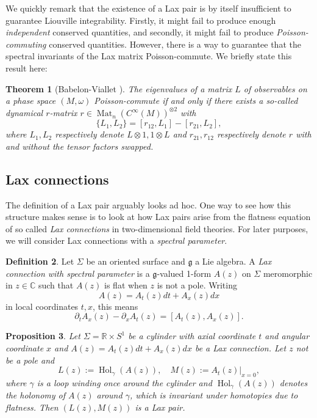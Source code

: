 \documentclass[11pt]{report}
\newtheorem{theorem}{Theorem}[section]
\newtheorem{prop}[theorem]{Proposition}
\theoremstyle{definition}
\newtheorem{definition}[theorem]{Definition}
\theoremstyle{remark}
\theoremstyle{remark}
\newcommand{\R}{\mathbb{R}}
\newcommand{\C}{\mathbb{C}}
\begin{document}
We quickly remark that the existence of a Lax pair is by itself insufficient to guarantee Liouville integrability. Firstly, it might fail to produce enough \emph{independent} conserved quantities, and secondly, it might fail to produce \emph{Poisson-commuting} conserved quantities. However, there is a way to guarantee that the spectral invariants of the Lax matrix Poisson-commute. We briefly state this result here:

\begin{theorem}[Babelon-Viallet \cite{book:arutyunov:elements}]
The eigenvalues of a matrix $L$ of observables on a phase space $(M,\omega)$ Poisson-commute if and only if there exists a so-called \emph{dynamical $r$-matrix} $r \in \operatorname{Mat}_n(C^\infty(M))^{\otimes 2}$ with
\begin{equation*}
\{ L_1, L_2 \} = [r_{12},L_1] - [r_{21},L_2],
\end{equation*}
where $L_1,L_2$ respectively denote $L \otimes 1, 1 \otimes L$ and $r_{21},r_{12}$ respectively denote $r$ with and without the tensor factors swapped.
\end{theorem}

\subsection{Lax connections}

The definition of a Lax pair arguably looks ad hoc. One way to see how this structure makes sense is to look at how Lax pairs arise from the flatness equation of so called \emph{Lax connections} in two-dimensional field theories. For later purposes, we will consider Lax connections with a \emph{spectral parameter}.

\begin{definition}
Let $\Sigma$ be an oriented surface and $\mathfrak{g}$ a Lie algebra. A \emph{Lax connection with spectral parameter} is a $\mathfrak{g}$-valued 1-form $A(z)$ on $\Sigma$ meromorphic in $z \in \C$ such that $A(z)$ is flat when $z$ is not a pole. Writing
\begin{equation*}
A(z) = A_t(z) dt + A_x(z) dx
\end{equation*}
in local coordinates $t,x$, this means
\begin{equation*}
\partial_t A_x(z) - \partial_x A_t(z) = [A_t(z),A_x(z)].
\end{equation*}
\end{definition}

\begin{prop}
Let $\Sigma = \R \times S^1$ be a cylinder with axial coordinate $t$ and angular coordinate $x$ and $A(z) = A_t(z) dt + A_x(z) dx$ be a Lax connection. Let $z$ not be a pole and
\begin{equation*}
L(z) := \operatorname{Hol}_\gamma(A(z)), \quad M(z) := A_t(z)|_{x=0},
\end{equation*}
where $\gamma$ is a loop winding once around the cylinder and $\operatorname{Hol}_{\gamma}(A(z))$ denotes the holonomy of $A(z)$ around $\gamma$, which is invariant under homotopies due to flatness. Then $(L(z),M(z))$ is a Lax pair.
\end{prop}
\end{document}
